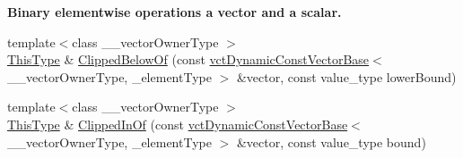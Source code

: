 \begin{Indent}{\bf Binary elementwise operations a vector and a scalar.}
\begin{DoxyCompactItemize}
\item 
{\footnotesize template$<$class \+\_\+\+\_\+vector\+Owner\+Type $>$ }\\\hyperlink{classvct_dynamic_const_vector_base_a39da273523717f678f54d3321ebca3dd}{This\+Type} \& \hyperlink{classvct_dynamic_vector_base_adc04ce9cda9d9c7535f625cb114b334a}{Clipped\+Below\+Of} (const \hyperlink{classvct_dynamic_const_vector_base}{vct\+Dynamic\+Const\+Vector\+Base}$<$ \+\_\+\+\_\+vector\+Owner\+Type, \+\_\+element\+Type $>$ \&vector, const value\+\_\+type lower\+Bound)
\item 
{\footnotesize template$<$class \+\_\+\+\_\+vector\+Owner\+Type $>$ }\\\hyperlink{classvct_dynamic_const_vector_base_a39da273523717f678f54d3321ebca3dd}{This\+Type} \& \hyperlink{classvct_dynamic_vector_base_a2a41f6dd284eee6ee782a554fd7ab54b}{Clipped\+In\+Of} (const \hyperlink{classvct_dynamic_const_vector_base}{vct\+Dynamic\+Const\+Vector\+Base}$<$ \+\_\+\+\_\+vector\+Owner\+Type, \+\_\+element\+Type $>$ \&vector, const value\+\_\+type bound)
\end{DoxyCompactItemize}
\end{Indent}
